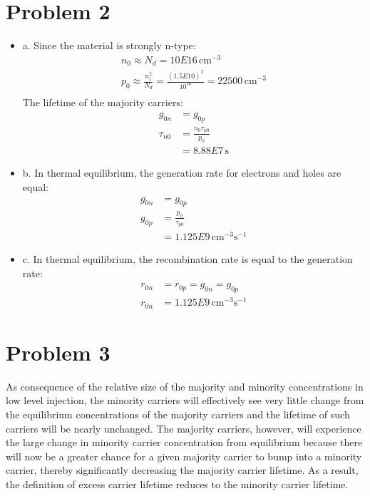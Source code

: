 \documentclass{article}
\newcommand{\unit}[1]{\ensuremath{\, \mathrm{#1}}}
\numberwithin{equation}{section}
\begin{document}
\section*{Problem 2}
\begin{itemize}
\item a. Since the material is strongly n-type:
\begin{align*}
n_0\approx N_d=10E16 \unit{cm^{-3}}\\
p_0\approx \frac{n_i^2}{N_d}=\frac{(1.5E10)^2}{10^{16}}=22500 \unit{cm^{-3}}\\
\end{align*}
The lifetime of the majority carriers:
\begin{align*}
g_{0n}&=g_{0p}\\
\tau_{n0}&=\frac{n_0\tau_{p0}}{p_0}\\
&=8.88E7 \unit{s}
\end{align*}
\item b. In thermal equilibrium, the generation rate for electrons and holes are equal:
\begin{align*}
g_{0n}&=g_{0p}\\
g_{0p}&=\frac{p_0}{\tau_{p0}}\\
&=1.125E9 \unit{cm^{-3}s^{-1}}
\end{align*}
\item c. In thermal equilibrium, the recombination rate is equal to the generation rate:
\begin{align*}
r_{0n}&=r_{0p}=g_{0n}=g_{0p}\\
r_{0n}&=1.125E9 \unit{cm^{-3}s^{-1}}
\end{align*}
\end{itemize}
\section*{Problem 3}
As consequence of the relative size of the majority and minority concentrations in low level injection, the minority carriers will effectively see very little change from the equilibrium concentrations of the majority carriers and the lifetime of such carriers will be nearly unchanged. The majority carriers, however, will experience the large change in minority carrier concentration from equilibrium because there will now be a greater chance for a given majority carrier to bump into a minority carrier, thereby significantly decreasing the majority carrier lifetime. As a result, the definition of excess carrier lifetime reduces to the minority carrier lifetime.   
\end{document}
